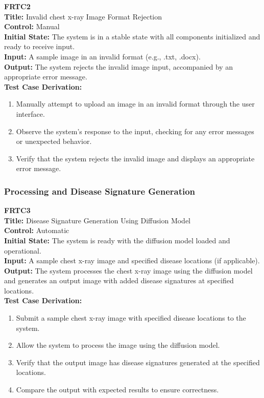 \documentclass[12pt, titlepage]{article}
\begin{document}
\textbf{FRTC2}\\
\textbf{Title:} Invalid chest x-ray Image Format Rejection\\
\textbf{Control:} Manual\\
\textbf{Initial State:} The system is in a stable state with all components initialized and ready to receive input.\\
\textbf{Input:} A sample image in an invalid format (e.g., .txt, .docx).\\
\textbf{Output:} The system rejects the invalid image input, accompanied by an appropriate error message.\\
\textbf{Test Case Derivation:}
\begin{enumerate}
  \item Manually attempt to upload an image in an invalid format through the user interface.
  \item Observe the system's response to the input, checking for any error messages or unexpected behavior.
  \item Verify that the system rejects the invalid image and displays an appropriate error message.
\end{enumerate}
\vspace{1em}

\subsubsection{Processing and Disease Signature Generation}
\textbf{FRTC3}\\
\textbf{Title:} Disease Signature Generation Using Diffusion Model\\
\textbf{Control:} Automatic\\
\textbf{Initial State:} The system is ready with the diffusion model loaded and operational.\\
\textbf{Input:} A sample chest x-ray image and specified disease locations (if applicable).\\
\textbf{Output:} The system processes the chest x-ray image using the diffusion model and generates an output image with added disease signatures at specified locations.\\
\textbf{Test Case Derivation:}
\begin{enumerate}
  \item Submit a sample chest x-ray image with specified disease locations to the system.
  \item Allow the system to process the image using the diffusion model.
  \item Verify that the output image has disease signatures generated at the specified locations.
  \item Compare the output with expected results to ensure correctness.
\end{enumerate}
\vspace{1em}
\end{document}

